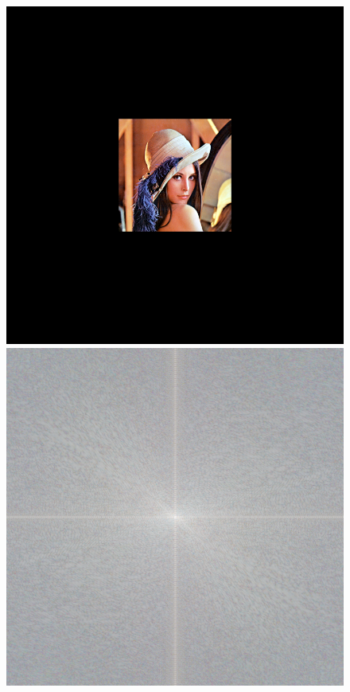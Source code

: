 \begin{figure}
{			{\includegraphics[scale=0.125]{decompoSzeliski_image1.png}}
			{\includegraphics[scale=0.125]{decompoSzeliski_fourier1.png}}
		}
\end{figure}

